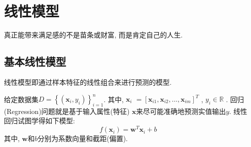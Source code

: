 \chapter{\quad 线性模型}
\vspace{0.5in}
	\begin{center}
	    \textcolor[RGB]{255, 0, 0}{\faHeart}真正能带来满足感的不是苗条或财富, 而是肯定自己的人生.\textcolor[RGB]{255, 0, 0}{\faHeart}
	\end{center}
\begin{center}
\end{center}
\section{基本线性模型}
线性模型即通过样本特征的线性组合来进行预测的模型. 

给定数据集$D=\left\{ \left( \boldsymbol{x}_i,y_i \right) \right\} _{i=1}^{n}$. 其中, $\boldsymbol{x}_i$ $=\left[ \boldsymbol{x}_{i1},\boldsymbol{x}_{i2},...,\boldsymbol{x}_{im} \right] ^T$ , $y_i\in \mathbb{R}$ . 回归(Regression)问题就是基于输入属性(特征) $\boldsymbol{x}$来尽可能准确地预测实值输出$y$. 线性回归试图学得如下模型:
\begin{equation}
f\left( \boldsymbol{x}_i \right) =\boldsymbol{w}^T\boldsymbol{x}_i+b
\end{equation}
其中, $\boldsymbol{w}$和$b$分别为系数向量和截距(偏置). 

